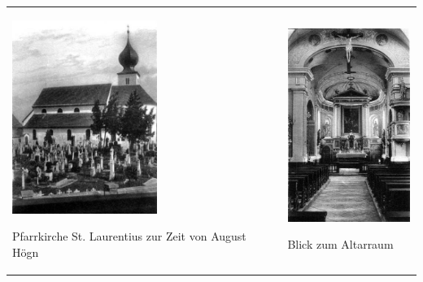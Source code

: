 \begin{center}
\begin{minipage}{9.491cm}
\begin{flushleft}
\tablefirsthead{}
\tablehead{}
\tabletail{}
\tablelasttail{}
\begin{supertabular}{m{4.8960004cm}m{4.196cm}}

\includegraphics[width=4.713cm,height=6.301cm]{pictures/zulassungsarbeit-img025.jpg}

Pfarrkirche St. Laurentius zur Zeit von
August Högn &

\begin{figure}
\img{}
\caption{}
\end{figure}



\includegraphics[width=4.013cm,height=6.292cm]{pictures/zulassungsarbeit-img026.jpg}

Blick zum Altarraum\\
\end{supertabular}
\end{flushleft}
\end{minipage}
\end{center}

\begin{figure}
\img{}
\caption{}
\end{figure}

